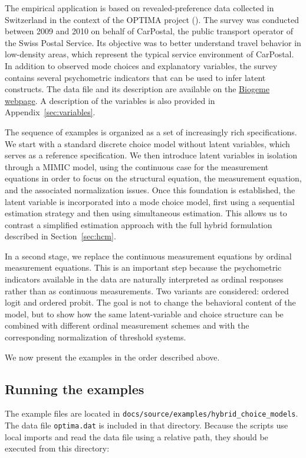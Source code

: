 \documentclass[12pt,a4paper]{article}
\let\OrigUnderscore\_
\def\_{\OrigUnderscore\penalty0\hspace{0pt}}%
\begin{document}
The empirical application is based on revealed-preference data
collected in Switzerland in the context of the OPTIMA project
(\cite{OptimaRP2011}). The survey was conducted between 2009 and 2010
on behalf of CarPostal, the public transport operator of the Swiss
Postal Service. Its objective was to better understand travel behavior
in low-density areas, which represent the typical service environment
of CarPostal. In addition to observed mode choices and explanatory
variables, the survey contains several psychometric indicators that
can be used to infer latent constructs. The data file and its
description are available on the
\href{http://biogeme.epfl.ch/#data}{Biogeme webpage}. A description of
the variables is also provided in Appendix~\ref{sec:variables}.

The sequence of examples is organized as a set of increasingly rich
specifications. We start with a standard discrete choice model without
latent variables, which serves as a reference specification. We then
introduce latent variables in isolation through a MIMIC model, using
the continuous case for the measurement equations in order to focus on
the structural equation, the measurement equation, and the associated
normalization issues. Once this foundation is established, the latent
variable is incorporated into a mode choice model, first using a
sequential estimation strategy and then using simultaneous estimation.
This allows us to contrast a simplified estimation approach with the
full hybrid formulation described in Section~\ref{sec:hcm}.

In a second stage, we replace the continuous measurement equations by
ordinal measurement equations. This is an important step because the
psychometric indicators available in the data are naturally
interpreted as ordinal responses rather than as continuous
measurements. Two variants are considered: ordered logit and ordered
probit. The goal is not to change the behavioral content of the model,
but to show how the same latent-variable and choice structure can be
combined with different ordinal measurement schemes and with the
corresponding normalization of threshold systems.

We now present the examples in the order described above.

\subsection{Running the examples}
\label{sec:running_examples}

The example files are located in
\texttt{docs/source/examples/hybrid\_choice\_models}. The data file
\texttt{optima.dat} is included in that directory. Because the scripts
use local imports and read the data file using a relative path, they
should be executed from this directory:
\end{document}
